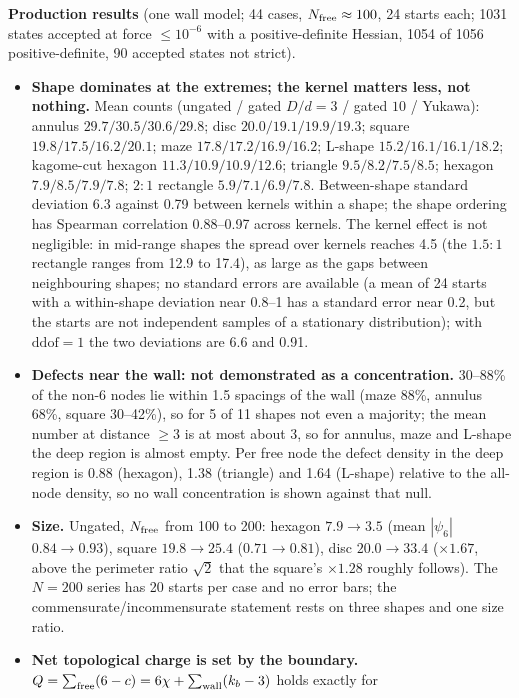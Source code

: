 \documentclass[11pt,a4paper]{article}
\begin{document}
\textbf{Production results} (one wall model; 44 cases, $N_{\rm free}\approx100$, 24 starts each; 1031 states accepted at force $\le10^{-6}$ with a
positive-definite Hessian, 1054 of 1056 positive-definite, 90 accepted states not strict).
\begin{itemize}[leftmargin=1.2em,itemsep=1pt]
\item \textbf{Shape dominates at the extremes; the kernel matters less, not nothing.} Mean counts (ungated / gated $D/d=3$ / gated $10$ / Yukawa): annulus $29.7/30.5/30.6/29.8$;
disc $20.0/19.1/19.9/19.3$; square $19.8/17.5/16.2/20.1$; maze $17.8/17.2/16.9/16.2$; L-shape $15.2/16.1/16.1/18.2$; kagome-cut hexagon
$11.3/10.9/10.9/12.6$; triangle $9.5/8.2/7.5/8.5$; hexagon $7.9/8.5/7.9/7.8$; $2{:}1$ rectangle $5.9/7.1/6.9/7.8$. Between-shape standard
deviation 6.3 against 0.79 between kernels within a shape; the shape ordering has Spearman correlation 0.88--0.97 across kernels. The kernel
effect is not negligible: in mid-range shapes the spread over kernels reaches 4.5 (the $1.5{:}1$ rectangle ranges from 12.9 to 17.4), as
large as the gaps between neighbouring shapes; no standard errors are available (a mean of 24 starts with a within-shape deviation near
0.8--1 has a standard error near 0.2, but the starts are not independent samples of a stationary distribution); with $\mathrm{ddof}=1$ the
two deviations are 6.6 and 0.91.
\item \textbf{Defects near the wall: not demonstrated as a concentration.} 30--88\% of the non-6 nodes lie within 1.5 spacings of the wall
(maze 88\%, annulus 68\%, square 30--42\%), so for 5 of 11 shapes not even a majority; the mean number at distance $\ge3$ is at most about
3, so for annulus, maze and L-shape the deep region is almost empty. Per free node the defect density in the deep region is 0.88
(hexagon), 1.38 (triangle) and 1.64 (L-shape) relative to the all-node density, so no wall concentration is shown against that null.
\item \textbf{Size.} Ungated, $N_{\rm free}$ from 100 to 200: hexagon $7.9\to3.5$ (mean $|\psi_6|$ $0.84\to0.93$), square $19.8\to25.4$
($0.71\to0.81$), disc $20.0\to33.4$ ($\times1.67$, above the perimeter ratio $\sqrt2$ that the square's $\times1.28$ roughly follows). The
$N=200$ series has 20 starts per case and no error bars; the commensurate/incommensurate statement rests on three shapes and one size ratio.
\item \textbf{Net topological charge is set by the boundary.} $Q=\sum_{\rm free}(6-c)=6\chi+\sum_{\rm wall}(k_b-3)$ holds exactly for

\end{itemize}
\end{document}
